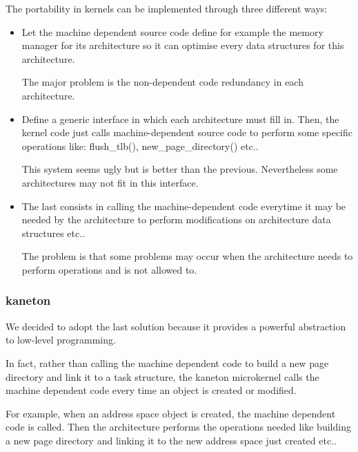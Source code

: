 {\begin{frame}
  The portability in kernels can be implemented through three different
  ways:

  \begin{itemize}[<+->]
    \item
      Let the machine dependent source code define for example the memory
      manager for its architecture so it can optimise every data structures
      for this architecture.

      \nl

      The major problem is the non-dependent code redundancy
      in each architecture.
    \item
      Define a generic interface in which each architecture must fill in.
      Then, the kernel code just calls machine-dependent source code
      to perform some specific operations like: flush\_tlb(),
      new\_page\_directory() etc..

      \nl

      This system seems ugly but is better than the previous. Nevertheless
      some architectures may not fit in this interface.
    \item
      The last consists in calling the machine-dependent code everytime
      it may be needed by the architecture to perform modifications on
      architecture data structures etc..

      \nl

      The problem is that some problems may occur when the architecture
      needs to perform operations and is not allowed to.
  \end{itemize}
\end{frame}


\begin{frame}
  \frametitle{kaneton}

  We decided to adopt the last solution because it provides a powerful
  abstraction to low-level programming.

  \nl

  In fact, rather than calling the machine dependent code to build
  a new page directory and link it to a task structure, the kaneton
  microkernel calls the machine dependent code every time an
  object is created or modified.

  \nl

  For example, when an address space object is created, the machine
  dependent code is called. Then the architecture performs the operations
  needed like building a new page directory and linking it to the
  new address space just created etc..


\end{frame}}
